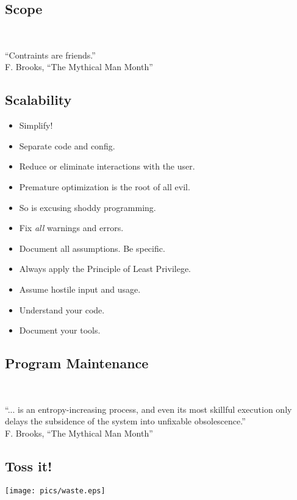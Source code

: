 \documentclass[xga]{xdvislides}
\begin{document}
\subsection{Scope}
\\
\Huge
\begin{center}
	``Contraints are friends.'' \\
	\addvspace{.2in}
	\small F. Brooks, ``The Mythical Man Month''
\end{center}
\Normalsize

\subsection{Scalability}
\begin{itemize}
	\item Simplify!
	\item Separate code and config.
	\item Reduce or eliminate interactions with the user.
	\item Premature optimization is the root of all evil.
	\item So is excusing shoddy programming.
	\item Fix {\em all} warnings and errors.
	\item Document all assumptions.  Be specific.
	\item Always apply the Principle of Least Privilege.
	\item Assume hostile input and usage.
	\item Understand your code.
	\item Document your tools.
\end{itemize}

\subsection{Program Maintenance}
\\
\Huge
\begin{center}
	``... is an entropy-increasing process, and even its most skillful
	execution only delays the subsidence of the system into unfixable
	obsolescence.'' \\
	\addvspace{.2in}
	\small F. Brooks, ``The Mythical Man Month''
\end{center}
\Normalsize

\subsection{Toss it!}
\vspace*{\fill}
\begin{center}
	\texttt{[image: pics/waste.eps]}
\end{center}
\vspace*{\fill}
\end{document}

